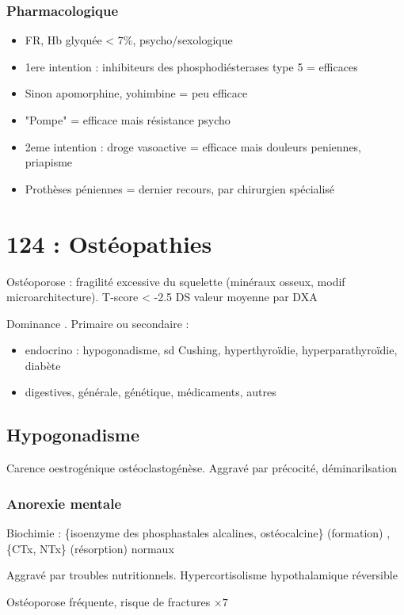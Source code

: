 \documentclass[11pt]{article}
\begin{document}
\subsubsection{Pharmacologique}
\label{sec:org4ebe86f}
\begin{itemize}
\item FR, Hb glyquée < 7\%, psycho/sexologique
\item 1ere intention : inhibiteurs des phosphodiésterases type 5 = efficaces
\item Sinon apomorphine, yohimbine = peu efficace
\item "Pompe" = efficace mais résistance psycho
\item 2eme intention : droge vasoactive = efficace mais douleurs peniennes, priapisme
\item Prothèses péniennes = dernier recours, par chirurgien spécialisé
\end{itemize}

\section{124 : Ostéopathies}
\label{sec:org3974f20}
Ostéoporose : fragilité excessive du squelette (\dec minéraux osseux, modif
microarchitecture). T-score < -2.5 DS valeur moyenne par DXA

Dominance \female. Primaire ou secondaire :
\begin{itemize}
\item endocrino : hypogonadisme, sd Cushing, hyperthyroïdie, hyperparathyroïdie, diabète
\item digestives, générale, génétique, médicaments, autres
\end{itemize}

\subsection{Hypogonadisme}
\label{sec:orgc0abaf5}
Carence oestrogénique \inc ostéoclastogénèse. Aggravé par précocité,
déminarilsation
\subsubsection{Anorexie mentale}
\label{sec:org8791f61}
Biochimie : \{isoenzyme des phosphastales alcalines, ostéocalcine\} (formation)
\dec, \{CTx, NTx\} (résorption) normaux

Aggravé par troubles nutritionnels. Hypercortisolisme hypothalamique réversible

Ostéoporose fréquente, risque de fractures \(\times 7\)
\end{document}
